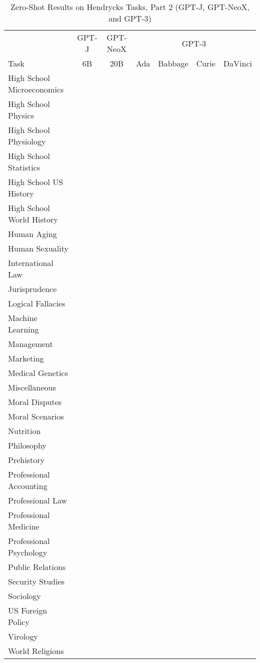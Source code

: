 \documentclass[11pt]{article}
\begin{document}
{\begin{landscape}
\begin{table*}    
\centering \begin{tabular}{l c c c c c c }
 & GPT-J & GPT-NeoX & \multicolumn{4}{c}{GPT-3} \\
Task & 6B & 20B & Ada & Babbage & Curie & DaVinci\\ \toprule
High School Microeconomics &  &  &  &  &  &  \\ 
High School Physics &  &  &  &  &  &  \\ 
High School Physiology &  &  &  &  &  &  \\ 
High School Statistics &  &  &  &  &  &  \\ 
High School US History &  &  &  &  &  &  \\ 
High School World History &  &  &  &  &  &  \\ 
Human Aging &  &  &  &  &  &  \\ 
Human Sexuality &  &  &  &  &  &  \\ 
International Law &  &  &  &  &  &  \\ 
Jurisprudence &  &  &  &  &  &  \\ 
Logical Fallacies &  &  &  &  &  &  \\ 
Machine Learning &  &  &  &  &  &  \\ 
Management &  &  &  &  &  &  \\ 
Marketing &  &  &  &  &  &  \\ 
Medical Genetics &  &  &  &  &  &  \\ 
Miscellaneous &  &  &  &  &  &  \\ 
Moral Disputes &  &  &  &  &  &  \\ 
Moral Scenarios &  &  &  &  &  &  \\ 
Nutrition &  &  &  &  &  &  \\ 
Philosophy &  &  &  &  &  &  \\ 
Prehistory &  &  &  &  &  &  \\ 
Professional Accounting &  &  &  &  &  &  \\ 
Professional Law &  &  &  &  &  &  \\ 
Professional Medicine &  &  &  &  &  &  \\ 
Professional Psychology &  &  &  &  &  &  \\ 
Public Relations &  &  &  &  &  &  \\ 
Security Studies &  &  &  &  &  &  \\ 
Sociology &  &  &  &  &  &  \\ 
US Foreign Policy &  &  &  &  &  &  \\ 
Virology &  &  &  &  &  &  \\ 
World Religions &  &  &  &  &  &  \\  \bottomrule
\end{tabular}
\caption{Zero-Shot Results on Hendrycks Tasks, Part 2 (GPT-J, GPT-NeoX, and GPT-3)}
\label{tab:hendrycks-gpt2}
\end{table*}


\end{landscape}}
\end{document}

